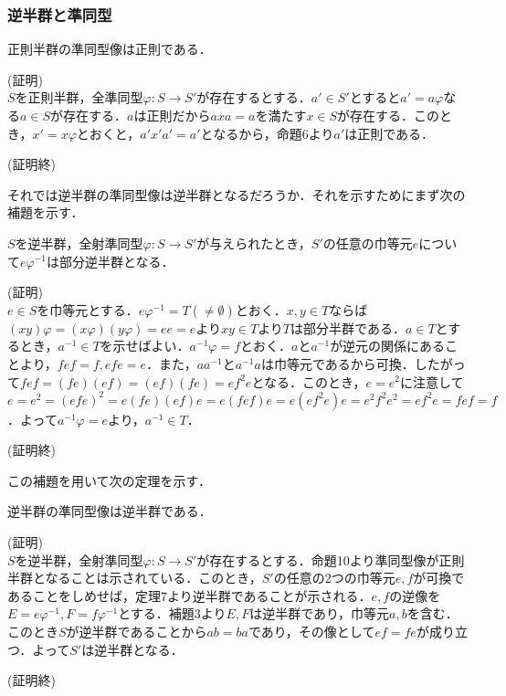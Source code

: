 \documentclass{jsarticle}
\begin{document}
\subsubsection{逆半群と準同型}
\begin{prop}
正則半群の準同型像は正則である．
\end{prop}
(証明)\\
$S$を正則半群，全準同型$\varphi:S\rightarrow S'$が存在するとする．$a'\in S'$とすると$a'=a\varphi$なる$a\in S$が存在する．$a$は正則だから$axa=a$を満たす$x\in S$が存在する．このとき，$x'=x\varphi$とおくと，$a'x'a'=a'$となるから，命題6より$a'$は正則である．
\begin{flushright}
(証明終)
\end{flushright}
それでは逆半群の準同型像は逆半群となるだろうか．それを示すためにまず次の補題を示す．
\begin{lem}
$S$を逆半群，全射準同型$\varphi:S\rightarrow S'$が与えられたとき，$S'$の任意の巾等元$e$について$e\varphi^{-1}$は部分逆半群となる．
\end{lem}
(証明)\\
$e\in S$を巾等元とする．$e\varphi^{-1}=T(\neq\emptyset)$とおく．$x,y\in T$ならば$(xy)\varphi=(x\varphi)(y\varphi)=ee=e$より$xy\in T$より$T$は部分半群である．$a\in T$とするとき，$a^{-1}\in T$を示せばよい．$a^{-1}\varphi=f$とおく．$a$と$a^{-1}$が逆元の関係にあることより，$fef=f,efe=e$．また，$aa^{-1}$と$a^{-1}a$は巾等元であるから可換．したがって$fef=(fe)(ef)=(ef)(fe)=ef^2e$となる．このとき，$e=e^2$に注意して$e=e^2=(efe)^2=e(fe)(ef)e=e(fef)e=e(ef^2e)e=e^2f^2e^2=ef^2e=fef=f$．よって$a^{-1}\varphi=e$より，$a^{-1}\in T$．
\begin{flushright}
(証明終)
\end{flushright}
この補題を用いて次の定理を示す．
\begin{thm}
逆半群の準同型像は逆半群である．
\end{thm}
(証明)\\
$S$を逆半群，全射準同型$\varphi:S\rightarrow S'$が存在するとする．命題10より準同型像が正則半群となることは示されている．このとき，$S'$の任意の2つの巾等元$e,f$が可換であることをしめせば，定理7より逆半群であることが示される．$e,f$の逆像を$E=e\varphi^{-1},F=f\varphi^{-1}$とする．補題3より$E,F$は逆半群であり，巾等元$a,b$を含む．このとき$S$が逆半群であることから$ab=ba$であり，その像として$ef=fe$が成り立つ．よって$S'$は逆半群となる．
\begin{flushright}
(証明終)
\end{flushright}
\end{document}
